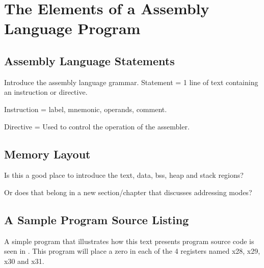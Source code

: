 \chapter{The Elements of a Assembly Language Program}
\label{chapter:elements}

\section{Assembly Language Statements}

Introduce the assembly language grammar. 
Statement = 1 line of text containing an instruction or directive.

Instruction = label, mnemonic, operands, comment.

Directive = Used to control the operation of the assembler.

\section{Memory Layout}

Is this a good place to introduce the text, data, bss, heap and stack regions?

Or does that belong in a new section/chapter that discusses addressing modes?


\section{A Sample Program Source Listing}

A simple program that illustrates how this text presents 
program source code is seen in .
This program will place a zero in each of the 4 registers 
named x28, x29, x30 and x31.


